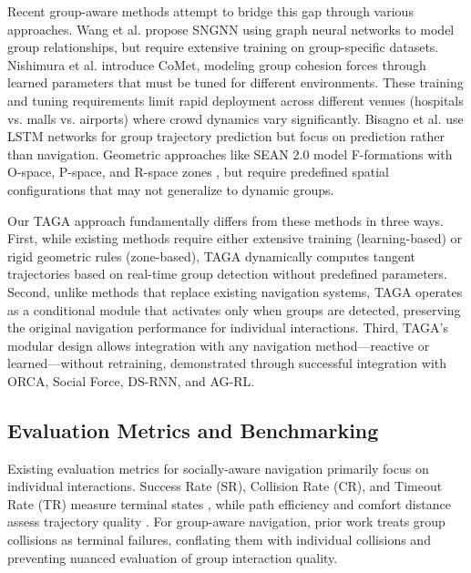 Recent group-aware methods attempt to bridge this gap through various approaches. Wang et al. \cite{wang2023learning} propose SNGNN using graph neural networks to model group relationships, but require extensive training on group-specific datasets. Nishimura et al. \cite{nishimura2022comet} introduce CoMet, modeling group cohesion forces through learned parameters that must be tuned for different environments.
These training and tuning requirements limit rapid deployment across different venues (hospitals vs. malls vs. airports) where crowd dynamics vary significantly. %
Bisagno et al. \cite{bisagno2018group} use LSTM networks for group trajectory prediction but focus on prediction rather than navigation. Geometric approaches like SEAN 2.0 \cite{tsoi2023sean} model F-formations with O-space, P-space, and R-space zones \cite{kendon1990conducting}, but require predefined spatial configurations that may not generalize to dynamic groups.

Our TAGA approach fundamentally differs from these methods in three ways. First, while existing methods require either extensive training (learning-based) or rigid geometric rules (zone-based), TAGA dynamically computes tangent trajectories based on real-time group detection without predefined parameters. Second, unlike methods that replace existing navigation systems, TAGA operates as a conditional module that activates only when groups are detected, preserving the original navigation performance for individual interactions. Third, TAGA's modular design allows integration with any navigation method—reactive or learned—without retraining, demonstrated through successful integration with ORCA, Social Force, DS-RNN, and AG-RL.

\subsection{Evaluation Metrics and Benchmarking}

Existing evaluation metrics for socially-aware navigation primarily focus on individual interactions. Success Rate (SR), Collision Rate (CR), and Timeout Rate (TR) measure terminal states \cite{gao2022evaluation}, while path efficiency and comfort distance assess trajectory quality \cite{mavrogiannis2023core}. For group-aware navigation, prior work \cite{group-aware} treats group collisions as terminal failures, conflating them with individual collisions and preventing nuanced evaluation of group interaction quality.

